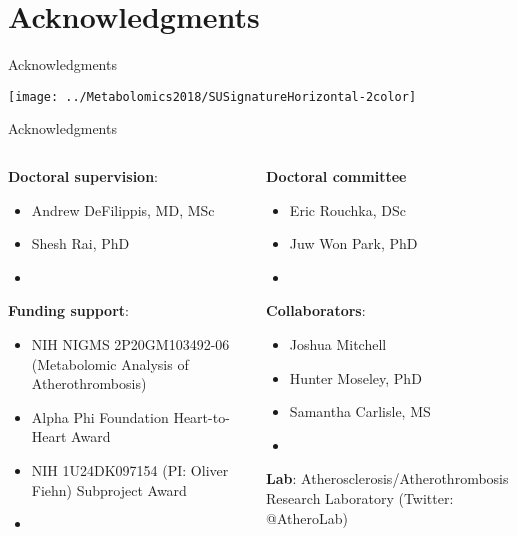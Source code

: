 \documentclass[xcolor=dvipsnames]{beamer}
\begin{document}
\section{Acknowledgments}

\begin{frame}{Acknowledgments}
	\vspace{-15.5pt}
	\begin{center}
		\texttt{[image: ../Metabolomics2018/SUSignatureHorizontal-2color]}
	\end{center}
\end{frame}

\begin{frame}{Acknowledgments}
	\begin{columns}
		\begin{column}{0.5\textwidth}
			\textbf{Doctoral supervision}:
			\begin{itemize}
				\item Andrew DeFilippis, MD, MSc
				\item Shesh Rai, PhD
				\item[]
			\end{itemize}
			\textbf{Funding support}:
			\begin{itemize}
				\item NIH NIGMS 2P20GM103492-06 (Metabolomic Analysis of Atherothrombosis)
				\item Alpha Phi Foundation Heart-to-Heart Award
				\item NIH 1U24DK097154 (PI: Oliver Fiehn) Subproject Award
				\item[]
			\end{itemize}
		\end{column}
		\vspace{-25.5pt}
		\begin{column}{0.5\textwidth}
			\textbf{Doctoral committee }
			\begin{itemize}
				\item Eric Rouchka, DSc
				\item Juw Won Park, PhD
				\item[]
			\end{itemize}
			\textbf{Collaborators}:
			\begin{itemize}
				\item Joshua Mitchell 
				\item Hunter Moseley, PhD
				\item Samantha Carlisle, MS
				\item[]
			\end{itemize}
			\textbf{Lab}: Atherosclerosis/Atherothrombosis Research Laboratory (Twitter: @AtheroLab)
		\end{column}
	\end{columns}
\end{frame}
\end{document}
